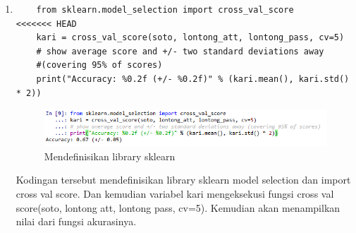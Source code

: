 \begin{enumerate}
\item
\begin{verbatim}
	from sklearn.model_selection import cross_val_score
<<<<<<< HEAD
	kari = cross_val_score(soto, lontong_att, lontong_pass, cv=5)
	# show average score and +/- two standard deviations away 
	#(covering 95% of scores)
	print("Accuracy: %0.2f (+/- %0.2f)" % (kari.mean(), kari.std() * 2))
\end{verbatim}
\begin{figure}[ht]
\centering
\includegraphics[scale=0.6]{figures/lontong/9.png}
\caption{Mendefinisikan library sklearn}
\end{figure}
\par
	Kodingan tersebut mendefinisikan library sklearn model selection dan import cross val score. Dan kemudian variabel kari mengeksekusi fungsi cross val score(soto, lontong att, lontong pass, cv=5). Kemudian akan menampilkan nilai dari fungsi akurasinya.


\end{enumerate}
